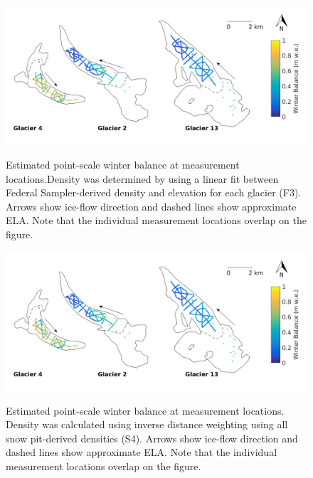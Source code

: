 \documentclass{sfuthesis}
\begin{document}
\begin{figure}
	\centering
	\includegraphics[width = \textwidth]{SWEmap_opt7.png}\\
	\caption{Estimated point-scale winter balance at measurement locations.Density was determined by using a linear fit between Federal Sampler-derived density and elevation for each glacier (F3). Arrows show ice-flow direction and dashed lines show approximate ELA. Note that the individual measurement locations overlap on the figure.}
	\label{fig:SWEmap_F3}
\end{figure}

\begin{figure}
	\centering
	\includegraphics[width = \textwidth]{SWEmap_opt8.png}\\
	\caption{Estimated point-scale winter balance at measurement locations. Density was calculated using inverse distance weighting using all snow pit-derived densities (S4). Arrows show ice-flow direction and dashed lines show approximate ELA. Note that the individual measurement locations overlap on the figure.}
	\label{fig:SWEmap_S4}
\end{figure}
\end{document}
